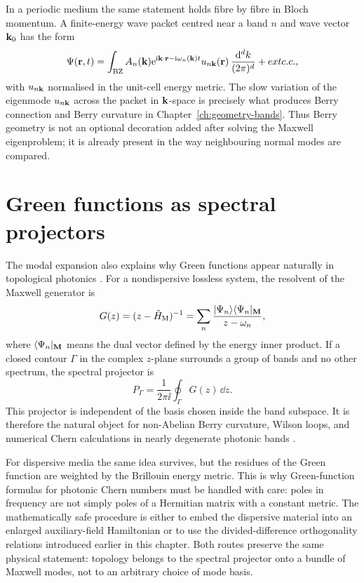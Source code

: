 In a periodic medium the same statement holds fibre by fibre in Bloch
momentum.  A finite-energy wave packet centred near a band $n$ and wave
vector $\mathbf{k}_0$ has the form
\begin{equation}\label{eq:ch3-bloch-wavepacket}
  \Psi(\mathbf{r},t)
  =\int_{\mathrm{BZ}} A_n(\mathbf{k})
  \mathrm{e}^{\mathrm{i}\mathbf{k}\cdot\mathbf{r}-\mathrm{i}\omega_n(\mathbf{k})t}
  u_{n\mathbf{k}}(\mathbf{r})\,\frac{\mathrm{d}^d k}{(2\pi)^d}+	ext{c.c.},
\end{equation}
with $u_{n\mathbf{k}}$ normalised in the unit-cell energy metric.  The
slow variation of the eigenmode $u_{n\mathbf{k}}$ across the packet in
$\mathbf{k}$-space is precisely what produces Berry connection and Berry
curvature in Chapter~\ref{ch:geometry-bands}.  Thus Berry geometry is
not an optional decoration added after solving the Maxwell eigenproblem;
it is already present in the way neighbouring normal modes are compared.

\section{Green functions as spectral projectors}
\label{sec:ch3-green-projector-practice}

The modal expansion also explains why Green functions appear naturally
in topological photonics
\cite{hsu2016bound}.  For a nondispersive lossless system, the
resolvent of the Maxwell generator is
\begin{equation}\label{eq:ch3-resolvent-modal}
  G(z)=(z-\hat{H}_{\mathrm{M}})^{-1}
  =\sum_n \frac{|\Psi_n\rangle\langle\Psi_n|_{\mathbf{M}}}{z-\omega_n},
\end{equation}
where $\langle\Psi_n|_{\mathbf{M}}$ means the dual vector defined by the
energy inner product.  If a closed contour $\Gamma$ in the complex
$z$-plane surrounds a group of bands and no other spectrum, the
spectral projector is
\begin{equation}\label{eq:ch3-contour-projector-expanded}
  P_\Gamma = \frac{1}{2\pi\ii}\oint_\Gamma G(z)\,\dd z.
\end{equation}
This projector is independent of the basis chosen inside the band
subspace.  It is therefore the natural object for non-Abelian Berry
curvature, Wilson loops, and numerical Chern calculations in nearly
degenerate photonic bands \cite{silveirinha2016bulk,unknown2008a}.

For dispersive media the same idea survives, but the residues of the
Green function are weighted by the Brillouin energy metric.  This is why
Green-function formulas for photonic Chern numbers must be handled with
care: poles in frequency are not simply poles of a Hermitian matrix
with a constant metric.  The mathematically safe procedure is either to
embed the dispersive material into an enlarged auxiliary-field
Hamiltonian or to use the divided-difference orthogonality relations
introduced earlier in this chapter.  Both routes preserve the same
physical statement: topology belongs to the spectral projector onto a
bundle of Maxwell modes, not to an arbitrary choice of mode basis.


